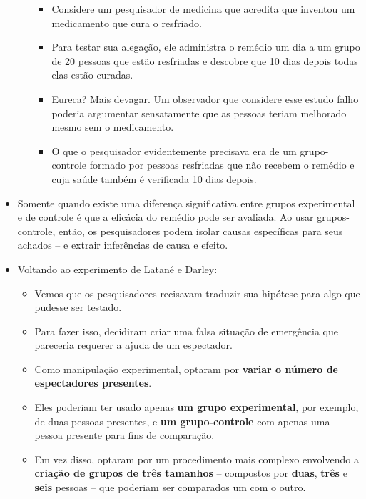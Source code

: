 \documentclass[
]{book}
\providecommand{\tightlist}{%
  \setlength{\itemsep}{0pt}\setlength{\parskip}{0pt}}
\begin{document}
\begin{itemize}
\begin{itemize}
    \begin{itemize}
    \tightlist
    \item
      Considere um pesquisador de medicina que acredita que
      inventou um medicamento que cura o resfriado.
    \item
      Para testar sua alegação, ele administra o remédio um dia a
      um grupo de 20 pessoas que estão resfriadas e descobre que
      10 dias depois todas elas estão curadas.
    \item
      Eureca? Mais devagar. Um observador que considere esse
      estudo falho poderia argumentar sensatamente que as pessoas
      teriam melhorado mesmo sem o medicamento.
    \item
      O que o pesquisador evidentemente precisava era de um
      grupo-controle formado por pessoas resfriadas que não
      recebem o remédio e cuja saúde também é verificada 10 dias
      depois.
    \end{itemize}
  \end{itemize}
\item
  Somente quando existe uma diferença significativa entre grupos
  experimental e de controle é que a eficácia do remédio pode ser
  avaliada. Ao usar grupos-controle, então, os
  pesquisadores podem isolar causas específicas para seus achados -- e
  extrair inferências de causa e efeito.
\item
  Voltando ao experimento de Latané e Darley:

  \begin{itemize}
  \tightlist
  \item
    Vemos que os pesquisadores recisavam traduzir sua hipótese para
    algo que pudesse ser testado.
  \item
    Para fazer isso, decidiram criar uma falsa situação de
    emergência que pareceria requerer a ajuda de um espectador.
  \item
    Como manipulação experimental, optaram por \textbf{variar o número de
    espectadores presentes}.
  \item
    Eles poderiam ter usado apenas \textbf{um grupo experimental}, por
    exemplo, de duas pessoas presentes, e \textbf{um grupo-controle} com
    apenas uma pessoa presente para fins de comparação.
  \item
    Em vez disso, optaram por um procedimento mais complexo
    envolvendo a \textbf{criação de grupos de três tamanhos} -- compostos
    por \textbf{duas}, \textbf{três} e \textbf{seis} pessoas -- que
    poderiam ser comparados um com o outro.
  \end{itemize}
\end{itemize}
\end{document}
